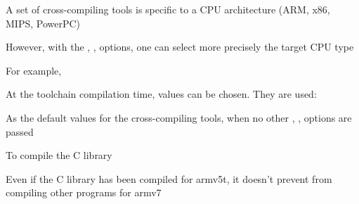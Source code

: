   \startitemize
  \item A set of cross-compiling tools is specific to a CPU architecture (ARM,
    x86, MIPS, PowerPC)
  \item However, with the , ,
     options, one can select more precisely the
    target CPU type
    \startitemize
    \item For example, 
    \stopitemize
  \item At the toolchain compilation time, values can be chosen. They are used:
    \startitemize
    \item As the default values for the cross-compiling tools, when no
      other , ,  options are
      passed
    \item To compile the C library
    \stopitemize
  \item Even if the C library has been compiled for armv5t, it doesn't
    prevent from compiling other programs for armv7
  \stopitemize
